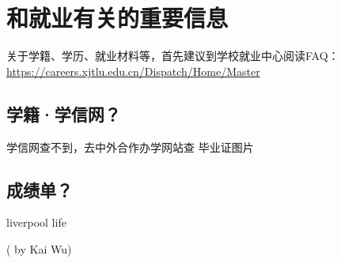 \section{和就业有关的重要信息}

关于学籍、学历、就业材料等，首先建议到学校就业中心阅读FAQ：\url{https://careers.xjtlu.edu.cn/Dispatch/Home/Master}

\subsection{学籍·学信网？}

学信网查不到，去中外合作办学网站查
毕业证图片

\subsection{成绩单？}

liverpool life



\begin{flushright}
( by Kai Wu)
\end{flushright}





% 

